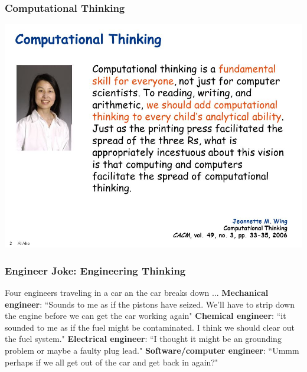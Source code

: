 \documentclass[11pt]{beamer}
\begin{document}

\begin{frame}
	\frametitle{Computational Thinking}
	\Enlarge
	
	\includegraphics[width=\textwidth]{./img/wing.jpg}
\end{frame}


\begin{frame}
	\frametitle{Engineer Joke: Engineering Thinking}
	\Enlarge
	\begin{itemize} 
		\myitem Four engineers traveling in a car an the car breaks down ...
		\myitem \textbf{Mechanical engineer}: ``Sounds to me as if the pistons have seized. We'll have to strip down the engine before we can get the car working again"
		\myitem \textbf{Chemical engineer}: ``it sounded to me as if the fuel might be contaminated. I think we should clear out the fuel system."
		\myitem \textbf{Electrical engineer}: ``I thought it might be an grounding problem or maybe a faulty plug lead."
		\myitem \textbf{Software/computer engineer}: ``Ummm perhaps if we all get out of the car and get back in again?"
	\end{itemize}
\end{frame}

\end{document}
